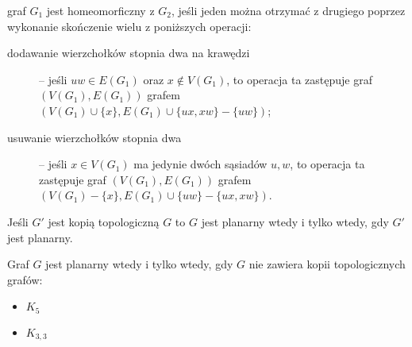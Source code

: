 \begin{definition}
graf $G_1$ jest homeomorficzny z $G_2$, jeśli jeden można otrzymać z drugiego poprzez wykonanie skończenie wielu z poniższych operacji:
\begin{description}
\item[dodawanie wierzchołków stopnia dwa na krawędzi] – jeśli $uw \in E (G_1)$ oraz $x \not \in V (G_1)$, to operacja ta zastępuje graf $(V (G_1), E (G_1))$ grafem $(V (G_1) \cup \{x\} , E (G_1) \cup \{ux, xw\} - \{uw\})$;
\item[usuwanie wierzchołków stopnia dwa] – jeśli $x\in V (G_1)$ ma jedynie dwóch sąsiadów $u, w$, to operacja ta zastępuje graf $(V (G_1), E (G_1))$ grafem $(V (G_1) - \{x\} , E (G_1) \cup \{uw\} - \{ux, xw\})$.
\end{description}
\end{definition}

\begin{fact*}
Jeśli $G'$ jest kopią topologiczną $G$ to $G$ jest planarny wtedy i tylko wtedy, gdy $G'$ jest planarny.
\end{fact*}

\begin{theorem}[Kuratowski]\label{the:Kuratowski}
Graf $G$ jest planarny wtedy i tylko wtedy, gdy $G$ nie zawiera kopii topologicznych grafów:
\begin{itemize}
\item $K_5$
\item $K_{3,3}$
\end{itemize}
\end{theorem}

